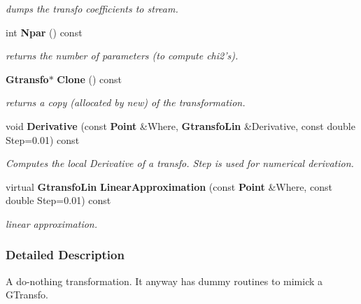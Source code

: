 \begin{CompactItemize}
\begin{CompactList}\small\item\em dumps the transfo coefficients to stream.\item\end{CompactList}\item 
{}
int {\bf Npar} () const\label{class_gtransfoidentity_a5}

\begin{CompactList}\small\item\em returns the number of parameters (to compute chi2's).\item\end{CompactList}\item 
{}
{\bf Gtransfo}$\ast$ {\bf Clone} () const\label{class_gtransfoidentity_a6}

\begin{CompactList}\small\item\em returns a copy (allocated by new) of the transformation.\item\end{CompactList}\item 
void {\bf Derivative} (const {\bf Point} \&Where, {\bf Gtransfo\-Lin} \&Derivative, const double Step=0.01) const
\begin{CompactList}\small\item\em Computes the local Derivative of a transfo. Step is used for numerical derivation.\item\end{CompactList}\item 
{}
virtual {\bf Gtransfo\-Lin} {\bf Linear\-Approximation} (const {\bf Point} \&Where, const double Step=0.01) const\label{class_gtransfoidentity_a8}

\begin{CompactList}\small\item\em linear approximation.\item\end{CompactList}\end{CompactItemize}


\subsubsection{Detailed Description}
A do-nothing transformation. It anyway has dummy routines to mimick a GTransfo.



